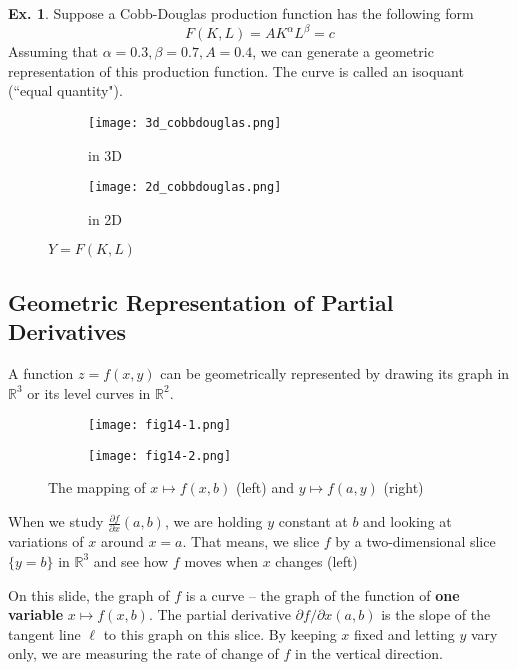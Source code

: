\documentclass[10pt,a4paper]{book}
\theoremstyle{definition}\newtheorem{definition}{Definition}
\theoremstyle{definition}\newtheorem{fact}{Fact}
\theoremstyle{definition}\newtheorem{ex}{Ex.}
\theoremstyle{definition}\newtheorem{project}{Project}
\theoremstyle{definition}\newtheorem{problem}{Problem}
\theoremstyle{definition}\newtheorem{example}{Example}
\numberwithin{theorem}{chapter}
\numberwithin{corollary}{chapter}
\numberwithin{assumption}{chapter}
\numberwithin{definition}{chapter}
\numberwithin{prop}{chapter}
\numberwithin{notation}{chapter}
\numberwithin{problem}{chapter}
\numberwithin{example}{chapter}
\numberwithin{fact}{chapter}
\numberwithin{ex}{chapter}
\def\R{\mathbb R}
\def\R{\mathbb R}
\begin{document}
	\begin{ex}
		Suppose a Cobb-Douglas production function has the following form
		\begin{equation*}
			F(K,L) = A K^\alpha L^\beta = c
		\end{equation*}
		Assuming that $\alpha=0.3, \beta=0.7, A = 0.4$, we can generate a geometric representation of this production function. The curve is called an isoquant (``equal quantity").
		
		\begin{figure}[h!]
			\centering
			\begin{subfigure}[b]{0.5\linewidth}
				\texttt{[image: 3d\_cobbdouglas.png]}
				\caption{in 3D}
			\end{subfigure}
			\begin{subfigure}[b]{0.4\linewidth}
				\texttt{[image: 2d\_cobbdouglas.png]}
				\caption{in 2D}
			\end{subfigure}
			\caption{$Y=F(K,L)$}
			\label{fig:coffee}
		\end{figure}
	\end{ex}
	
	\subsection{Geometric Representation of Partial Derivatives}
	
	A function $z=f(x,y)$ can be geometrically represented by drawing its graph in $\R^3$ or its level curves in $\R^2$. 
	
	\begin{figure}[h!]
		\centering
		\begin{subfigure}[b]{0.4\linewidth}
			\texttt{[image: fig14-1.png]}
		\end{subfigure}
		\begin{subfigure}[b]{0.4\linewidth}
			\texttt{[image: fig14-2.png]}
		\end{subfigure}
		\caption{The mapping of $x\mapsto f(x,b)$ (left) and $y\mapsto f(a,y)$ (right)}
		\label{fig:partial}
	\end{figure}
	
	When we study $\frac{\partial f}{\partial x} (a,b)$, we are holding $y$ constant at $b$ and looking at variations of $x$ around $x=a$. That means, we slice $f$ by a two-dimensional slice $\{y=b\}$ in $\R^3$ and see how $f$ moves when $x$ changes (left)
	
	
	On this slide, the graph of $f$ is a curve -- the graph of the function of \textbf{one variable} $x\mapsto f(x,b)$. The partial derivative $\partial f / \partial x (a,b)$ is the slope of the tangent line $\ell$ to this graph on this slice. By keeping $x$ fixed and letting $y$ vary only, we are measuring the rate of change of $f$ in the vertical direction. 
	
\end{document}
